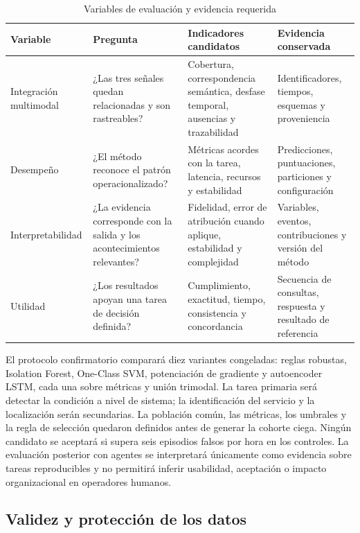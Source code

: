 \documentclass[conference]{IEEEtran}
\begin{document}
\begin{table}[t]
\caption{Variables de evaluación y evidencia requerida}
\label{tab:evaluacion}
\centering
\footnotesize
\renewcommand{\arraystretch}{1.15}
\begin{tabular}{p{}p{}p{}p{}}
\toprule
\textbf{Variable} & \textbf{Pregunta} & \textbf{Indicadores candidatos} & \textbf{Evidencia conservada} \\
\midrule
Integración multimodal & ¿Las tres señales quedan relacionadas y son rastreables? & Cobertura, correspondencia semántica, desfase temporal, ausencias y trazabilidad & Identificadores, tiempos, esquemas y proveniencia \\
Desempeño & ¿El método reconoce el patrón operacionalizado? & Métricas acordes con la tarea, latencia, recursos y estabilidad & Predicciones, puntuaciones, particiones y configuración \\
Interpretabilidad & ¿La evidencia corresponde con la salida y los acontecimientos relevantes? & Fidelidad, error de atribución cuando aplique, estabilidad y complejidad & Variables, eventos, contribuciones y versión del método \\
Utilidad & ¿Los resultados apoyan una tarea de decisión definida? & Cumplimiento, exactitud, tiempo, consistencia y concordancia & Secuencia de consultas, respuesta y resultado de referencia \\
\bottomrule
\end{tabular}
\end{table}

El protocolo confirmatorio comparará diez variantes congeladas: reglas robustas, Isolation Forest, One-Class SVM, potenciación de gradiente y autoencoder LSTM, cada una sobre métricas y unión trimodal. La tarea primaria será detectar la condición a nivel de sistema; la identificación del servicio y la localización serán secundarias. La población común, las métricas, los umbrales y la regla de selección quedaron definidos antes de generar la cohorte ciega. Ningún candidato se aceptará si supera seis episodios falsos por hora en los controles. La evaluación posterior con agentes se interpretará únicamente como evidencia sobre tareas reproducibles y no permitirá inferir usabilidad, aceptación o impacto organizacional en operadores humanos.

\subsection{Validez y protección de los datos}
\end{document}
